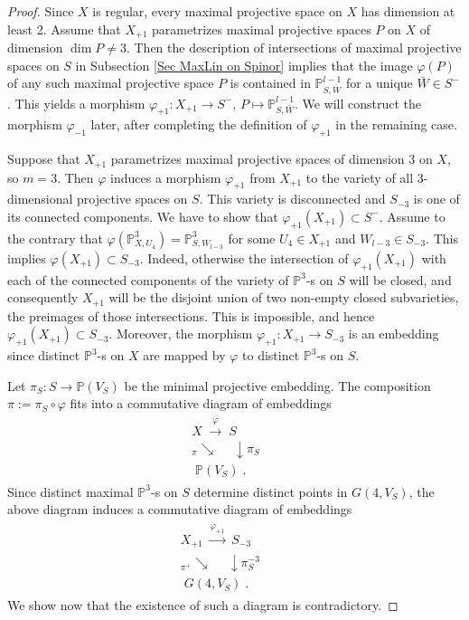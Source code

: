 \documentclass[12pt]{amsart}
\def\PP {{\mathbb P}}     %
\def\lw  {\longrightarrow}
\begin{document}
\begin{proof}
Since $X$ is regular, every maximal projective space on $X$ has dimension at least 2. Assume that $X_{+1}$ parametrizes maximal projective spaces $P$ on $X$ of dimension $\dim P\ne 3$. Then the description of intersections of maximal projective spaces on $S$ in Subsection \ref{Sec MaxLin on Spinor} implies that the image $\varphi(P)$ of any such maximal projective space $P$ is contained in $\PP^{l-1}_{S,\bar W}$ for a unique $\bar W\in S^{-}$. This yields a morphism $\varphi_{+1}:X_{+1}\to S^{-}$, $P\mapsto \PP^{l-1}_{S,\bar W}$. We will construct the morphism $\varphi_{-1}$ later, after completing the definition of $\varphi_{+1}$ in the remaining case.

Suppose that $X_{+1}$ parametrizes maximal projective spaces of dimension $3$ on $X$, so $m=3$. Then $\varphi$ induces a morphism $\varphi_{+1}$ from $X_{+1}$ to the variety of all 3-dimensional projective spaces on $S$. This variety is disconnected and $S_{-3}$ is one of its connected components. We have to show that $\varphi_{+1}(X_{+1})\subset S^{-}$. Assume to the contrary that $\varphi(\PP^{3}_{X,U_4})=\PP^3_{S,W_{l-3}}$ for some $U_4\in X_{+1}$ and $W_{l-3}\in S_{-3}$. This implies $\varphi(X_{+1})\subset S_{-3}$. Indeed, otherwise the intersection of $\varphi_{+1}(X_{+1})$ with each of the connected components of the variety of $\PP^3$-s on $S$ will be closed, and consequently $X_{+1}$ will be the disjoint union of two non-empty closed subvarieties, the preimages of those intersections. This is impossible, and hence $\varphi_{+1}(X_{+1}) \subset S_{-3}$. Moreover, the morphism $\varphi_{+1}:X_{+1}\to S_{-3}$ is an embedding since distinct $\PP^3$-s on $X$ are mapped by $\varphi$ to distinct $\PP^3$-s on $S$.

Let $\pi_S: S\to \PP(V_S)$ be the minimal projective embedding. The composition $\pi:=\pi_S\circ\varphi$ fits into a commutative diagram of embeddings
\begin{gather*}
\begin{array}{r}
X \;\stackrel{\varphi}{\lw}\; S \;\quad\qquad \\
  {}_{\pi}\searrow  \quad\;\downarrow \pi_S \\
  \; \PP(V_S) \;.
\end{array}
\end{gather*}
Since distinct maximal $\PP^3$-s on $S$ determine distinct points in $G(4,V_S)$, the above diagram induces a commutative diagram of embeddings
\begin{gather}\label{For pi minus 3}
\begin{array}{r}
X_{+1} \; \stackrel{\varphi_{+1}}{\lw} \; S_{-3} \quad\qquad\\
 {}_{\pi^+}\searrow  \quad\;\downarrow \pi_S^{-3} \quad\\
 \; G(4,V_S) \;.
\end{array}
\end{gather}
We show now that the existence of such a diagram is contradictory.


\end{proof}
\end{document}
